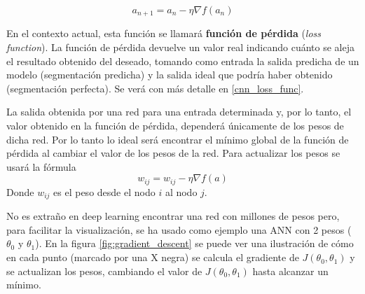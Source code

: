 \begin{equation}\label{eqn:gradient_descent}
a_{n+1} = a_n - \eta \nabla f (a_n)
\end{equation}

En el contexto actual, esta función se llamará \textbf{función de pérdida} (\textit{loss function}). La función de pérdida devuelve un valor real indicando cuánto se aleja el resultado obtenido del deseado, tomando como entrada la salida predicha de un modelo (segmentación predicha) y la salida ideal que podría haber obtenido (segmentación perfecta). Se verá con más detalle en \ref{cnn_loss_func}.

La salida obtenida por una red para una entrada determinada y, por lo tanto, el valor obtenido en la función de pérdida, dependerá únicamente de los pesos de dicha red. Por lo tanto lo ideal será encontrar el mínimo global de la función de pérdida al cambiar el valor de los pesos de la red. Para actualizar los pesos se usará la fórmula 
\begin{equation}\label{eqn:weight_update}
w_{ij} = w_{ij} - \eta \nabla f(a)
\end{equation}
Donde $w_{ij}$ es el peso desde el nodo $i$ al nodo $j$.

No es extraño en deep learning encontrar una red con millones de pesos pero, para facilitar la visualización, se ha usado como ejemplo una ANN con 2 pesos ($\theta_0$ y $\theta_1$). En la figura \ref{fig:gradient_descent} se puede ver una ilustración de cómo en cada punto (marcado por una X negra) se calcula el gradiente de $J(\theta_0, \theta_1)$ y se actualizan los pesos, cambiando el valor de $J(\theta_0, \theta_1)$ hasta alcanzar un mínimo.

